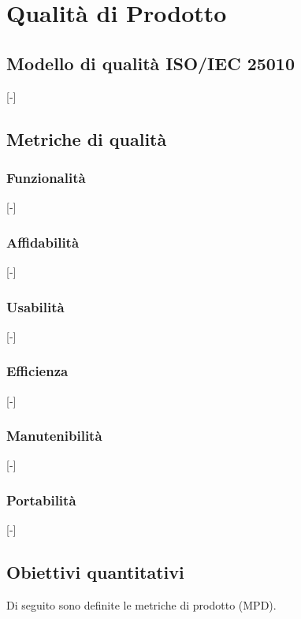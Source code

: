 \section{Qualità di Prodotto}

\subsection{Modello di qualità ISO/IEC 25010}
[-]

\subsection{Metriche di qualità}

\subsubsection{Funzionalità}
[-]

\subsubsection{Affidabilità}
[-]

\subsubsection{Usabilità}
[-]

\subsubsection{Efficienza}
[-]

\subsubsection{Manutenibilità}
[-]

\subsubsection{Portabilità}
[-]

\subsection{Obiettivi quantitativi}
Di seguito sono definite le metriche di prodotto (MPD).

